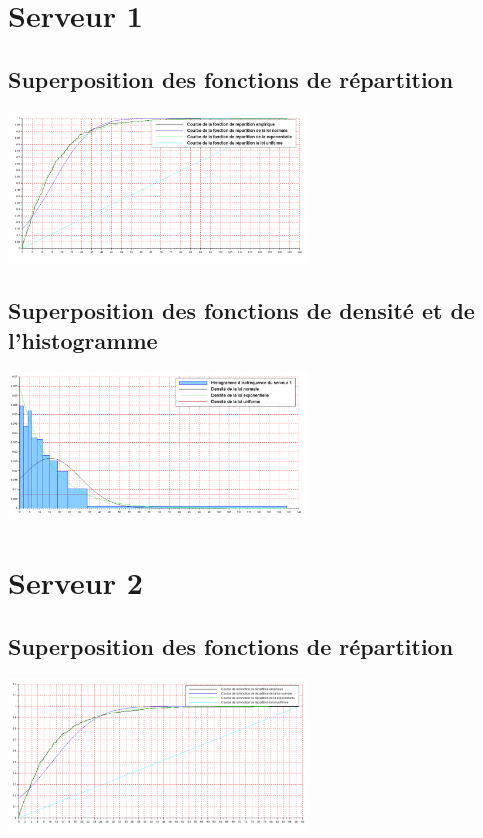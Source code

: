 \documentclass{article}
\begin{document}
\section{Serveur 1}

\subsection{Superposition des fonctions de répartition}
\begin{center}
\includegraphics[width=300px]{img/S1_repartitions.png}
\end{center}
\paragraph{}

\subsection{Superposition des fonctions de densité et de l'histogramme}
\begin{center}
\includegraphics[width=300px]{img/S1_densite.png}
\end{center}
\paragraph{}

\section{Serveur 2}

\subsection{Superposition des fonctions de répartition}
\begin{center}
\includegraphics[width=300px]{img/S2_repartitions.png}
\end{center}
\end{document}

